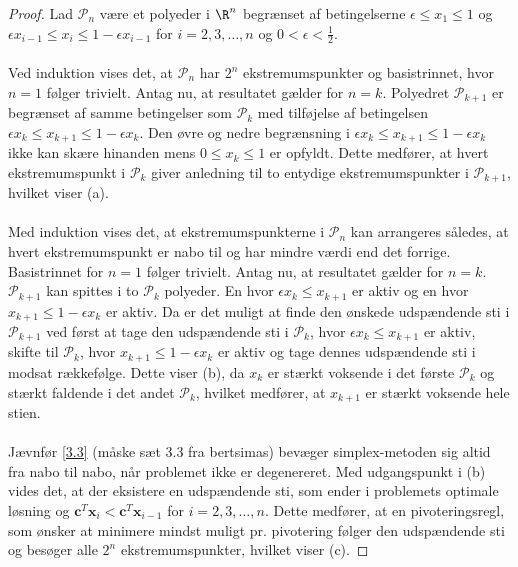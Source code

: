 \begin{proof}
%
Lad $\mathcal{P}_n$ være et polyeder i $\R^n$ begrænset af betingelserne $\epsilon \leq x_1 \leq 1$ og $\epsilon x_{i-1} \leq x_i \leq 1 - \epsilon x_{i-1}$ for $i = 2, 3, \ldots, n$ og $0 < \epsilon < \frac{1}{2}$.\\\\
%
Ved induktion vises det, at $\mathcal{P}_n$ har $2^n$ ekstremumspunkter og basistrinnet, hvor $n=1$ følger trivielt.
Antag nu, at resultatet gælder for $n=k$.
Polyedret $\mathcal{P}_{k+1}$ er begrænset af samme betingelser som $\mathcal{P}_{k}$ med tilføjelse af betingelsen $\epsilon x_{k} \leq x_{k+1} \leq 1 - \epsilon x_{k}$.
Den øvre og nedre begrænsning i $\epsilon x_{k} \leq x_{k+1} \leq 1 - \epsilon x_{k}$ ikke kan skære hinanden mens $ 0 \leq x_k \leq 1$ er opfyldt.
Dette medfører, at hvert ekstremumspunkt i $\mathcal{P}_{k}$ giver anledning til to entydige ekstremumspunkter i $\mathcal{P}_{k+1}$, hvilket viser (a).\\\\
%
Med induktion vises det, at ekstremumspunkterne i  $\mathcal{P}_n$ kan arrangeres således, at hvert ekstremumspunkt er nabo til og har mindre værdi end det forrige.
Basistrinnet for $n=1$ følger trivielt.
Antag nu, at resultatet gælder for  $n = k$.
$\mathcal{P}_{k+1}$ kan spittes i to $\mathcal{P}_{k}$ polyeder.
En hvor $\epsilon x_{k} \leq x_{k+1}$ er aktiv og en hvor $x_{k+1} \leq 1 - \epsilon x_{k}$ er aktiv.
Da er det muligt at finde den ønskede udspændende sti i $\mathcal{P}_{k+1}$ ved først at tage den udspændende sti i $\mathcal{P}_{k}$, hvor $\epsilon x_{k} \leq x_{k+1}$ er aktiv, skifte til $\mathcal{P}_{k}$, hvor $x_{k+1} \leq 1 - \epsilon x_{k}$ er aktiv og tage dennes udspændende sti i modsat rækkefølge.
Dette viser (b), da $x_k$ er stærkt voksende i det første $\mathcal{P}_{k}$ og stærkt faldende i det andet $\mathcal{P}_{k}$, hvilket medfører, at $x_{k+1}$ er stærkt voksende hele stien.
%
\\\\
Jævnfør \ref{3.3} (måske sæt 3.3 fra bertsimas) bevæger simplex-metoden sig altid fra nabo til nabo, når problemet ikke er degenereret.
Med udgangspunkt i (b) vides det, at der eksistere en udspændende sti, som ender i problemets optimale løsning og $\textbf{c}^T\textbf{x}_i < \textbf{c}^T\textbf{x}_{i-1}$ for $i = 2, 3, \ldots ,n$.
Dette medfører, at en pivoteringsregl, som ønsker at minimere mindst muligt pr. pivotering følger den udspændende sti og besøger alle $2^n$ ekstremumspunkter, hvilket viser (c).
\end{proof}